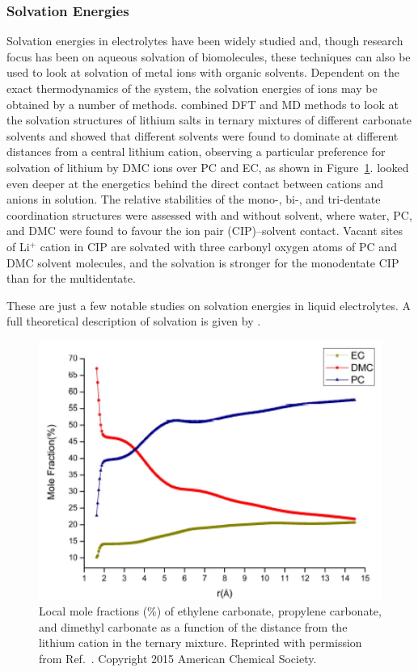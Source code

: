 \documentclass[../main.tex]{subfiles}
\begin{document}
\subsubsection{Solvation Energies}
Solvation energies in electrolytes have been widely studied and, though research focus has been on aqueous solvation of biomolecules, these techniques can also be used to look at solvation of metal ions with organic solvents. Dependent on the exact thermodynamics of the system, the solvation energies of ions may be obtained by a number of methods. \citeauthor{Skarmoutsos_2015} combined DFT and MD methods to look at the solvation structures of lithium salts in ternary mixtures of different carbonate solvents and showed that different solvents were found to dominate at different distances from a central lithium cation, observing a particular preference for solvation of lithium by DMC ions over PC and EC, as shown in Figure~\ref{fig:solvation}. \citeauthor{Takeuchi_2012} looked even deeper at the energetics behind the direct contact between cations and anions in solution.\cite{Takeuchi_2012} The relative stabilities of the mono-, bi-, and tri-dentate coordination structures were assessed with and without solvent, where water, PC, and DMC were found to favour the ion pair (CIP)–solvent contact. Vacant sites of Li$^+$ cation in CIP are solvated with three carbonyl oxygen atoms of PC and DMC solvent molecules, and the solvation is stronger for the monodentate CIP than for the multidentate.\cite{Takeuchi_2012}

These are just a few notable studies on solvation energies in liquid electrolytes. A full theoretical description of solvation is given by \citeauthor{Lazaridis_1998}.\cite{Lazaridis_1998}

\begin{figure}
    \centering
    \includegraphics[scale=0.3]{figures/solvents_ternary_mixute_le.jpg}
    \caption{Local mole fractions (\%) of ethylene carbonate, propylene carbonate, and dimethyl carbonate as a function of the distance from the lithium cation in the ternary mixture. Reprinted with permission from Ref.~. Copyright 2015 American Chemical Society.}
    \label{fig:solvation}
\end{figure}
\end{document}
